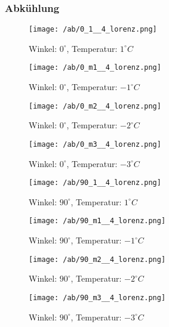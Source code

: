 \subsubsection{Abkühlung}
\begin{figure}[h]
\centering
\texttt{[image: /ab/0\_1\_\_4\_lorenz.png]}
\caption{Winkel: $ 0^\circ$, Temperatur: $ 1^\circ C$}
\end{figure}
\begin{figure}[h]
\centering
\texttt{[image: /ab/0\_m1\_\_4\_lorenz.png]}
\caption{Winkel: $ 0^\circ$, Temperatur: $ -1^\circ C$}
\end{figure}
\clearpage
\begin{figure}[c]
\centering
\texttt{[image: /ab/0\_m2\_\_4\_lorenz.png]}
\caption{Winkel: $ 0^\circ$, Temperatur: $ -2^\circ C$}
\end{figure}
\begin{figure}[c]
\centering
\texttt{[image: /ab/0\_m3\_\_4\_lorenz.png]}
\caption{Winkel: $ 0^\circ$, Temperatur: $ -3^\circ C$}
\end{figure}
\clearpage
\begin{figure}[c]
\centering
\texttt{[image: /ab/90\_1\_\_4\_lorenz.png]}
\caption{Winkel: $ 90^\circ$, Temperatur: $ 1^\circ C$}
\end{figure}
\begin{figure}[c]
\centering
\texttt{[image: /ab/90\_m1\_\_4\_lorenz.png]}
\caption{Winkel: $ 90^\circ$, Temperatur: $ -1^\circ C$}
\end{figure}
\clearpage
\begin{figure}[c]
\centering
\texttt{[image: /ab/90\_m2\_\_4\_lorenz.png]}
\caption{Winkel: $ 90^\circ$, Temperatur: $ -2^\circ C$}
\end{figure}
\begin{figure}[c]
\centering
\texttt{[image: /ab/90\_m3\_\_4\_lorenz.png]}
\caption{Winkel: $ 90^\circ$, Temperatur: $ -3^\circ C$}
\end{figure}
\clearpage